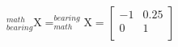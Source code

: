 \documentclass[document]{standalone}
\begin{document}
\begin{preview}
\Large

${\displaystyle _{bearing}^{math}\textrm{X}=_{math}^{bearing}\textrm{X}=
\begin{bmatrix}
-1 & 0.25 \\
0 & 1 \\
\end{bmatrix}}
$
\end{preview}
\end{document}
